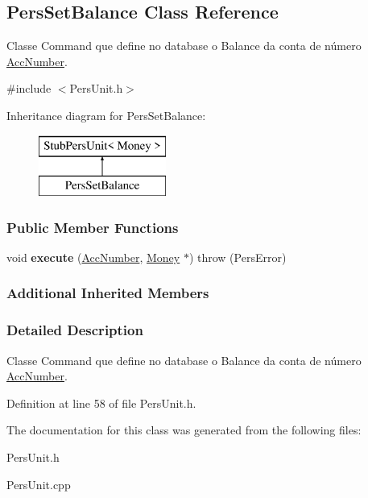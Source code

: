 \hypertarget{classPersSetBalance}{\subsection{Pers\-Set\-Balance Class Reference}
\label{d9/d6f/classPersSetBalance}
}


Classe Command que define no database o Balance da conta de número \hyperlink{classAccNumber}{Acc\-Number}.  




{\ttfamily \#include $<$Pers\-Unit.\-h$>$}

Inheritance diagram for Pers\-Set\-Balance\-:\begin{figure}[H]
\begin{center}
\leavevmode
\includegraphics[height=2.000000cm]{d9/d6f/classPersSetBalance}
\end{center}
\end{figure}
\subsubsection*{Public Member Functions}
\begin{DoxyCompactItemize}
\item 
\hypertarget{classPersSetBalance_ac62b70b221a0e04e9e467f6d9e7162d1}{void {\bfseries execute} (\hyperlink{classAccNumber}{Acc\-Number}, \hyperlink{classMoney}{Money} $\ast$)  throw (\-Pers\-Error)}\label{d9/d6f/classPersSetBalance_ac62b70b221a0e04e9e467f6d9e7162d1}

\end{DoxyCompactItemize}
\subsubsection*{Additional Inherited Members}


\subsubsection{Detailed Description}
Classe Command que define no database o Balance da conta de número \hyperlink{classAccNumber}{Acc\-Number}. 

Definition at line 58 of file Pers\-Unit.\-h.



The documentation for this class was generated from the following files\-:\begin{DoxyCompactItemize}
\item 
Pers\-Unit.\-h\item 
Pers\-Unit.\-cpp\end{DoxyCompactItemize}
